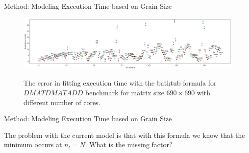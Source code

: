 \documentclass[10pt]{beamer}
\begin{document}
\begin{frame}{Method: Modeling Execution Time based on Grain Size}
	\begin{outline}	
\begin{figure}[H]
		{\hfill\includegraphics[scale=.2]{images/bathtub/prediction_error_overall690.png}}	
	\caption{The error in fitting execution time with the bathtub formula for $DMATDMATADD$ benchmark for matrix size $690\times690$ with different number of cores.}	
	\label{fig25}
\end{figure}
\end{outline}
\end{frame}

\begin{frame}{Method: Modeling Execution Time based on Grain Size}
	\begin{outline}	
The problem with the current model is that with this formula we know that the minimum occurs at $n_t=N$.
\pause
What is the missing factor?
\end{outline}
\end{frame}


\end{document}
